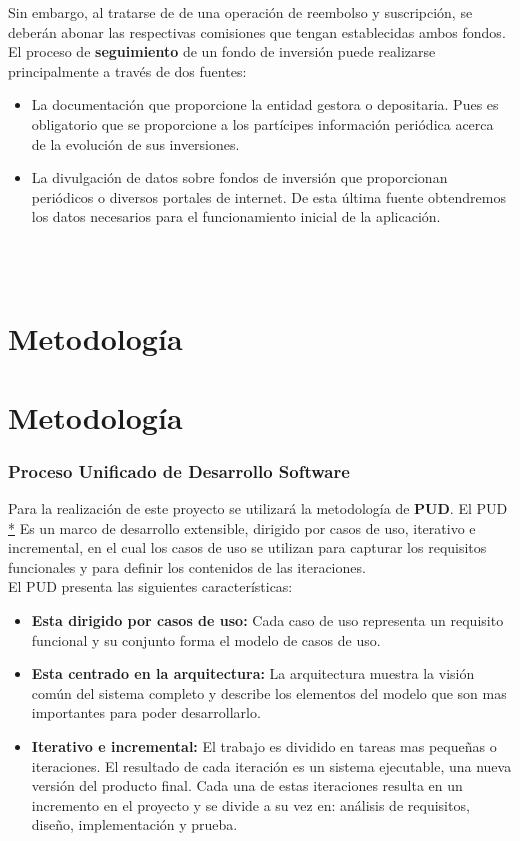 \documentclass[12pt, a4paper]{article}
\newcommand*\parttitle{}
\let\origpart\part
\renewcommand*{\part}[2][]{%
	\ifx\\#1\\%
	\origpart{#2}%
	\renewcommand*\parttitle{#2}%
	\else
	\origpart[#1]{#2}%
	\renewcommand*\parttitle{#1}%
	\fi
}
\begin{document}
Sin embargo, al tratarse de de una operación de reembolso y suscripción, se deberán abonar las respectivas comisiones que tengan establecidas ambos fondos.\\ 

El proceso de \textbf{seguimiento} de un fondo de inversión puede realizarse principalmente a través de dos fuentes:
\begin{itemize}
	\item La documentación que proporcione la entidad gestora o depositaria. Pues es obligatorio que se proporcione a los partícipes información periódica acerca de la evolución de sus inversiones.
	\item La divulgación de datos sobre fondos de inversión que proporcionan periódicos o diversos portales de internet. De esta última fuente obtendremos los datos necesarios para el funcionamiento inicial de la aplicación.
\end{itemize}
\newpage

\part{Metodología}

\section{Proceso Unificado de Desarrollo Software}
Para la realización de este proyecto se utilizará la metodología de \textbf{ \gls{PUD}}. El \gls{PUD} \href{https://es.wikipedia.org/wiki/Proceso_unificado}{*} Es un marco de desarrollo extensible, dirigido por casos de uso, iterativo e incremental, en el cual los casos de uso se utilizan para capturar los requisitos funcionales y para definir los contenidos de las iteraciones.\\

El \gls{PUD} presenta las siguientes características:

\begin{itemize}
	\item \textbf{Esta dirigido por casos de uso:} Cada caso de uso representa un requisito funcional y su conjunto forma el modelo de casos de uso.
	\item \textbf{Esta centrado en la arquitectura:} La arquitectura muestra la visión común del sistema completo y describe los elementos del modelo que son mas importantes para poder desarrollarlo.
	\item \textbf{Iterativo e incremental: } El trabajo es dividido en tareas mas pequeñas o iteraciones. El resultado de cada iteración es un sistema ejecutable, una nueva versión del producto final. Cada una de estas iteraciones resulta en un incremento en el proyecto y se divide a su vez en: análisis de requisitos, diseño, implementación y prueba.
\end{itemize}
\end{document}
